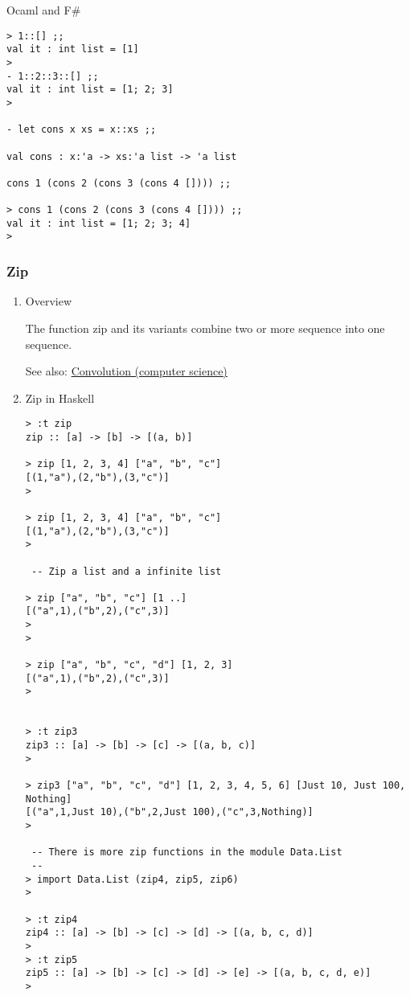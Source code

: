 \documentclass[11pt]{article}
\begin{document}
Ocaml and F\#

\begin{verbatim}
> 1::[] ;;
val it : int list = [1]
> 
- 1::2::3::[] ;;
val it : int list = [1; 2; 3]
> 

- let cons x xs = x::xs ;;

val cons : x:'a -> xs:'a list -> 'a list

cons 1 (cons 2 (cons 3 (cons 4 []))) ;;

> cons 1 (cons 2 (cons 3 (cons 4 []))) ;;  
val it : int list = [1; 2; 3; 4]
>
\end{verbatim}

\subsubsection{Zip}
\label{sec-1-10-4}
\begin{enumerate}
\item Overview
\label{sec-1-10-4-1}

The function zip and its variants combine two or more sequence into one sequence.

See also: \href{https://en.wikipedia.org/wiki/Convolution_(computer_science)}{Convolution (computer science)}

\item Zip in Haskell
\label{sec-1-10-4-2}

\begin{verbatim}
> :t zip
zip :: [a] -> [b] -> [(a, b)]

> zip [1, 2, 3, 4] ["a", "b", "c"]
[(1,"a"),(2,"b"),(3,"c")]
> 

> zip [1, 2, 3, 4] ["a", "b", "c"]
[(1,"a"),(2,"b"),(3,"c")]
>

 -- Zip a list and a infinite list 

> zip ["a", "b", "c"] [1 ..]
[("a",1),("b",2),("c",3)]
> 
> 

> zip ["a", "b", "c", "d"] [1, 2, 3]
[("a",1),("b",2),("c",3)]
> 


> :t zip3
zip3 :: [a] -> [b] -> [c] -> [(a, b, c)]
> 

> zip3 ["a", "b", "c", "d"] [1, 2, 3, 4, 5, 6] [Just 10, Just 100, Nothing]
[("a",1,Just 10),("b",2,Just 100),("c",3,Nothing)]
> 

 -- There is more zip functions in the module Data.List
 --
> import Data.List (zip4, zip5, zip6)
> 

> :t zip4
zip4 :: [a] -> [b] -> [c] -> [d] -> [(a, b, c, d)]
> 
> :t zip5
zip5 :: [a] -> [b] -> [c] -> [d] -> [e] -> [(a, b, c, d, e)]
>
\end{verbatim}


\end{enumerate}
\end{document}
